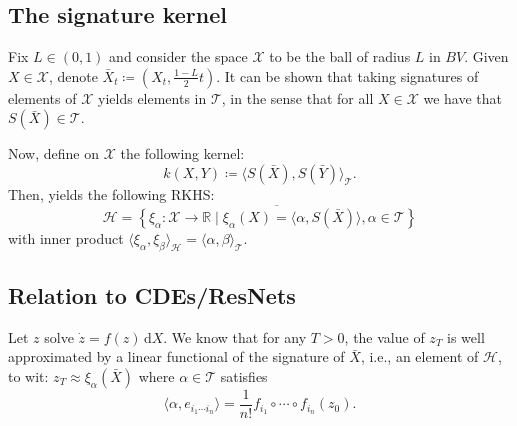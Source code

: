 \documentclass[10pt, reqno]{article}
\theoremstyle{definition}
\theoremstyle{plain}
\newcommand{\R}{\mathbb{R}}
\begin{document}
\subsection{The signature kernel}
Fix \(L\in (0,1)\) and consider the space \(\mathscr{X}\) to be the ball of radius \(L\) in \(BV\).
Given \(X\in\mathscr{X}\), denote \(\bar{X}_t\coloneqq(X_t,\tfrac{1-L}{2}t)\).
It can be shown that taking signatures of elements of \(\mathscr{X}\) yields elements in \(\mathscr{T}\), in the sense that for all
\(X\in\mathscr{X}\) we have that \(S(\bar X)\in\mathscr{T}\).

Now, define on \(\mathscr{X}\) the following kernel:
\[
	k(X,Y)\coloneqq\langle S(\bar X),S(\bar Y)\rangle_{\mathscr{T}}.
\]
Then,  yields the following RKHS:
\[
	\mathscr{H}=\overline{\left\{ \xi_\alpha\colon\mathscr{X}\to\R\mid\xi_\alpha(X)=\langle \alpha,S(\bar X)\rangle,\alpha\in\mathscr{T} \right\}}
\]
with inner product \(\langle\xi_\alpha,\xi_\beta\rangle_{\mathscr{H}}=\langle \alpha,\beta\rangle_{\mathscr{T}}.\)

\subsection{Relation to CDEs/ResNets}
Let \(z\) solve \(\dot z=f(z)\,\mathrm dX\).
We know that for any \(T>0\), the value of \(z_T\) is well approximated by a linear functional of the signature of \(\bar{X}\), i.e., an element of
\(\mathscr{H}\), to wit: \( z_T\approx\xi_\alpha(\bar{X}) \) where \(\alpha\in\mathscr{T}\) satisfies
\[
	\langle\alpha, e_{i_1\dotsm i_n}\rangle = \frac{1}{n!}f_{i_1}\circ\dotsm\circ f_{i_n}(z_0).
\]
\end{document}
